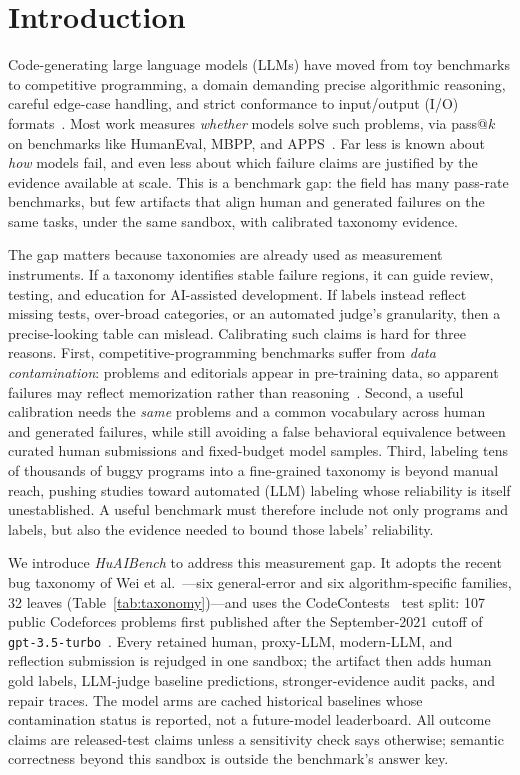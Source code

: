 \documentclass[conference]{IEEEtran}
\begin{document}
\section{Introduction}
\label{sec:intro}

Code-generating large language models (LLMs) have moved from toy benchmarks to
competitive programming, a domain demanding precise algorithmic reasoning, careful
edge-case handling, and strict conformance to input/output (I/O)
formats~\cite{li2022alphacode,wei2026evaluating}. Most work measures \emph{whether}
models solve such problems, via pass@$k$ on benchmarks like HumanEval, MBPP, and
APPS~\cite{chen2021codex,austin2021mbpp,hendrycks2021apps,liu2023evalplus}. Far
less is known about \emph{how} models fail, and even less about which failure claims
are justified by the evidence available at scale. This is a benchmark gap: the field
has many pass-rate benchmarks, but few artifacts that align human and generated failures on
the same tasks, under the same sandbox, with calibrated taxonomy evidence.

The gap matters because taxonomies are already used as measurement instruments.
If a taxonomy identifies stable failure regions, it can guide review, testing, and
education for AI-assisted development. If labels instead reflect missing tests,
over-broad categories, or an automated judge's granularity, then a precise-looking
table can mislead. Calibrating such claims is hard for three reasons. First,
competitive-programming benchmarks suffer from \emph{data contamination}: problems
and editorials appear in pre-training data, so apparent failures may reflect
memorization rather than reasoning~\cite{jain2024livecodebench,wei2026evaluating}.
Second, a useful calibration needs the \emph{same} problems and a common vocabulary
across human and generated failures, while still avoiding a false behavioral
equivalence between curated human submissions and fixed-budget model samples. Third,
labeling tens of thousands of buggy programs into a fine-grained taxonomy is beyond
manual reach, pushing studies toward automated (LLM) labeling whose reliability is
itself unestablished. A useful benchmark must therefore include not only programs and
labels, but also the evidence needed to bound those labels' reliability.

We introduce \emph{HuAIBench} to address this measurement gap. It adopts the recent
bug taxonomy of Wei et al.~\cite{wei2026evaluating}---six general-error and six
algorithm-specific families, 32 leaves (Table~\ref{tab:taxonomy})---and uses the
CodeContests~\cite{li2022alphacode} test split: 107 public Codeforces problems first
published after the September-2021 cutoff of \texttt{gpt-3.5-turbo}~\cite{openai2023gpt4}.
Every retained human, proxy-LLM, modern-LLM, and reflection submission is rejudged in
one sandbox; the artifact then adds human gold labels, LLM-judge baseline
predictions, stronger-evidence audit packs, and repair traces. The model arms are
cached historical baselines whose contamination status is reported, not a
future-model leaderboard. All outcome claims are released-test claims unless a
sensitivity check says otherwise; semantic correctness beyond this sandbox is outside
the benchmark's answer key.
\end{document}
